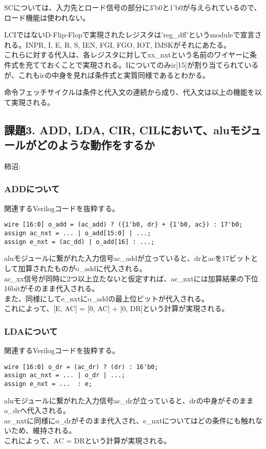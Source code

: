 \documentclass{jsarticle}
\begin{document}
SCについては、入力先とロード信号の部分に3'b0と1'b0が与えられているので、ロード機能は使われない。

LCIではないD-Flip-Flopで実現されたレジスタは'reg\_dff'というmoduleで宣言される。INPR, I, E, R, S, IEN, FGI, FGO, IOT, IMSKがそれにあたる。\\
これらに対する代入は、各レジスタに対してxx\_nxtという名前のワイヤーに条件式を充てておくことで実現される。Iについてのみir[15]が割り当てられているが、これもirの中身を見れば条件式と実質同様であるとわかる。

命令フェッチサイクルは条件と代入文の連続から成り、代入文は以上の機能を以て実現される。

\subsection*{課題3. ADD, LDA, CIR, CILにおいて、aluモジュールがどのような動作をするか}
柿沼: 
\subsubsection*{ADDについて}
関連するVerilogコードを抜粋する。
\begin{lstlisting}
wire [16:0] o_add = (ac_add) ? ({1'b0, dr} + {1'b0, ac}) : 17'b0;
assign ac_nxt = ... | o_add[15:0] | ...;
assign e_nxt = (ac_dd) | o_add[16] : ...;
\end{lstlisting}

aluモジュールに繋がれた入力信号ac\_addが立っていると、drとacを17ビットとして加算されたものがo\_addに代入される。\\
ac\_xx信号が同時に2つ以上立たないと仮定すれば、ac\_nxtには加算結果の下位16bitがそのまま代入される。\\
また、同様にしてe\_nxtにo\_addの最上位ビットが代入される。\\
これによって、[E, AC] = [0, AC] + [0, DR]という計算が実現される。\\

\subsubsection*{LDAについて}
関連するVerilogコードを抜粋する。
\begin{lstlisting}
wire [16:0] o_dr = (ac_dr) ? (dr) : 16'b0;
assign ac_nxt = ... | o_dr | ...;
assign e_nxt = ...  : e;
\end{lstlisting}
aluモジュールに繋がれた入力信号ac\_drが立っていると、drの中身がそのままo\_drへ代入される。\\
ac\_nxtに同様にo\_drがそのまま代入され、e\_nxtについてはどの条件にも触れないため、維持される。\\
これによって、AC = DRという計算が実現される。
\end{document}
